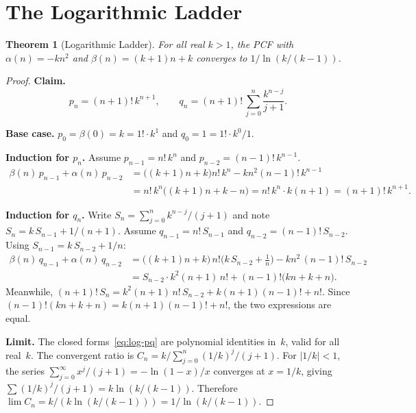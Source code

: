 \documentclass[11pt,a4paper]{article}
\theoremstyle{plain}
\newtheorem{theorem}{Theorem}[section]
\theoremstyle{definition}
\theoremstyle{remark}
\begin{document}
\section{The Logarithmic Ladder}\label{sec:log}

\begin{theorem}[Logarithmic Ladder]\label{thm:log}
For all real $k > 1$, the PCF with
$\alpha(n) = -kn^2$ and $\beta(n) = (k{+}1)n + k$
converges to $1/\ln(k/(k{-}1))$.
\end{theorem}

\begin{proof}
\textbf{Claim.}
\begin{equation}\label{eq:log-pq}
  p_n = (n{+}1)!\, k^{n+1}, \qquad
  q_n = (n{+}1)!\, \sum_{j=0}^{n} \frac{k^{n-j}}{j+1}.
\end{equation}

\textbf{Base case.}
$p_0 = \beta(0) = k = 1!\cdot k^1$ and $q_0 = 1 = 1!\cdot k^0/1$.

\medskip\noindent\textbf{Induction for $p_n$.}
Assume $p_{n-1} = n!\,k^n$ and $p_{n-2} = (n{-}1)!\,k^{n-1}$.
\begin{align*}
  \beta(n)\,p_{n-1} + \alpha(n)\,p_{n-2}
  &= \bigl((k{+}1)n + k\bigr) n!\,k^n - kn^2 (n{-}1)!\,k^{n-1} \\
  &= n!\,k^n\bigl((k{+}1)n + k - n\bigr)
   = n!\,k^n \cdot k(n{+}1) = (n{+}1)!\,k^{n+1}.
\end{align*}

\medskip\noindent\textbf{Induction for $q_n$.}
Write $S_n = \sum_{j=0}^{n} k^{n-j}/(j{+}1)$
and note $S_n = k\,S_{n-1} + 1/(n{+}1)$.
Assume $q_{n-1} = n!\,S_{n-1}$ and $q_{n-2} = (n{-}1)!\,S_{n-2}$.
Using $S_{n-1} = k\,S_{n-2} + 1/n$:
\begin{align*}
\beta(n)\,q_{n-1} + \alpha(n)\,q_{n-2}
&= \bigl((k{+}1)n{+}k\bigr)\,n!\bigl(k\,S_{n-2}+\tfrac{1}{n}\bigr)
   - kn^2\,(n{-}1)!\,S_{n-2} \\
&= S_{n-2}\cdot k^2(n{+}1)\,n!
   + (n{-}1)!\bigl(kn+k+n\bigr).
\end{align*}
Meanwhile,
$(n{+}1)!\,S_n
= k^2(n{+}1)\,n!\,S_{n-2} + k(n{+}1)(n{-}1)! + n!$.
Since $(n{-}1)!(kn{+}k{+}n) = k(n{+}1)(n{-}1)! + n!$,
the two expressions are equal.

\medskip\noindent\textbf{Limit.}
The closed forms~\eqref{eq:log-pq} are polynomial identities in~$k$,
valid for all real~$k$.
The convergent ratio is
$C_n = k/\sum_{j=0}^{n}(1/k)^j/(j{+}1)$.
For $|1/k| < 1$, the series
$\sum_{j=0}^{\infty} x^j/(j{+}1) = -\ln(1{-}x)/x$
converges at $x = 1/k$, giving
$\sum (1/k)^j/(j{+}1) = k\ln(k/(k{-}1))$.
Therefore
$\lim C_n = k/(k\ln(k/(k{-}1))) = 1/\ln(k/(k{-}1))$.
\end{proof}
\end{document}
